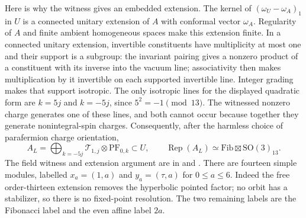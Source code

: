 Here is why the witness gives an embedded extension. The kernel of
$(\omega_U-\omega_A)_1$ in $U$ is a connected unitary extension of
$A$ with conformal vector $\omega_A$. Regularity of $A$ and finite
ambient homogeneous spaces make this extension finite. In a connected
unitary extension, invertible constituents have multiplicity at most
one and their support is a subgroup: the invariant pairing gives a
nonzero product of a constituent with its inverse into the vacuum
line; associativity then makes multiplication by it invertible on
each supported invertible line. Integer grading makes that support
isotropic. The only isotropic lines for the displayed quadratic form
are $k=5j$ and $k=-5j$, since $5^2=-1\pmod{13}$. The witnessed
nonzero charge generates one of these lines, and both cannot occur
because together they generate nonintegral-spin charges. Consequently,
after the harmless choice of parafermion charge orientation,
\[
 A_L=\bigoplus_{k=-5j}\mathcal T_{1,j}\otimes\mathrm{PF}_{0,k}
 \subset U,\qquad
 \operatorname{Rep}(A_L)\simeq
 \mathrm{Fib}\boxtimes\mathrm{SO}(3)_{13}.
\]
The field witness and extension argument are in
 and
.
There are fourteen simple modules, labelled $x_a=(1,a)$ and
$y_a=(\tau,a)$ for $0\le a\le6$. Indeed the free order-thirteen
extension removes the hyperbolic pointed factor; no orbit has a
stabilizer, so there is no fixed-point resolution. The two remaining
labels are the Fibonacci label and the even affine label $2a$.

